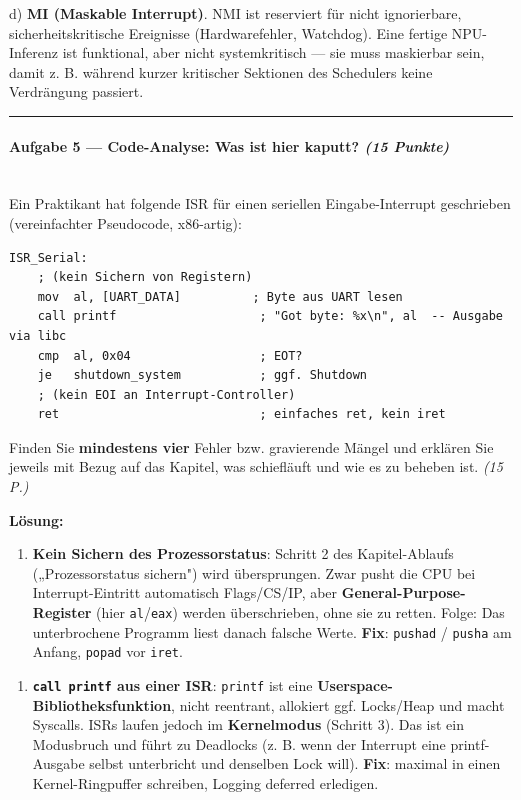 \documentclass[11pt, a4paper]{article}
\begin{document}
d) \textbf{MI (Maskable Interrupt)}. NMI ist reserviert für nicht ignorierbare, sicherheitskritische Ereignisse (Hardwarefehler, Watchdog). Eine fertige NPU-Inferenz ist funktional, aber nicht systemkritisch — sie muss maskierbar sein, damit z. B. während kurzer kritischer Sektionen des Schedulers keine Verdrängung passiert.



\noindent\textcolor{rulegray}{\rule{\linewidth}{0.4pt}}


\paragraph{Aufgabe 5 — Code-Analyse: Was ist hier kaputt? \textit{(15 Punkte)}}\mbox{}\\[2pt]

Ein Praktikant hat folgende ISR für einen seriellen Eingabe-Interrupt geschrieben (vereinfachter Pseudocode, x86-artig):


\begin{lstlisting}
ISR_Serial:
    ; (kein Sichern von Registern)
    mov  al, [UART_DATA]          ; Byte aus UART lesen
    call printf                    ; "Got byte: %x\n", al  -- Ausgabe via libc
    cmp  al, 0x04                  ; EOT?
    je   shutdown_system           ; ggf. Shutdown
    ; (kein EOI an Interrupt-Controller)
    ret                            ; einfaches ret, kein iret
\end{lstlisting}


Finden Sie \textbf{mindestens vier} Fehler bzw. gravierende Mängel und erklären Sie jeweils mit Bezug auf das Kapitel, was schiefläuft und wie es zu beheben ist. \textit{(15 P.)}


\textbf{Lösung:}


\begin{enumerate}
  \item \textbf{Kein Sichern des Prozessorstatus}: Schritt 2 des Kapitel-Ablaufs („Prozessorstatus sichern") wird übersprungen. Zwar pusht die CPU bei Interrupt-Eintritt automatisch Flags/CS/IP, aber \textbf{General-Purpose-Register} (hier \texttt{al}/\texttt{eax}) werden überschrieben, ohne sie zu retten. Folge: Das unterbrochene Programm liest danach falsche Werte. \textbf{Fix}: \texttt{pushad} / \texttt{pusha} am Anfang, \texttt{popad} vor \texttt{iret}.
\end{enumerate}

\begin{enumerate}
  \item \textbf{\texttt{call printf} aus einer ISR}: \texttt{printf} ist eine \textbf{Userspace-Bibliotheksfunktion}, nicht reentrant, allokiert ggf. Locks/Heap und macht Syscalls. ISRs laufen jedoch im \textbf{Kernelmodus} (Schritt 3). Das ist ein Modusbruch und führt zu Deadlocks (z. B. wenn der Interrupt eine printf-Ausgabe selbst unterbricht und denselben Lock will). \textbf{Fix}: maximal in einen Kernel-Ringpuffer schreiben, Logging deferred erledigen.
\end{enumerate}
\end{document}
